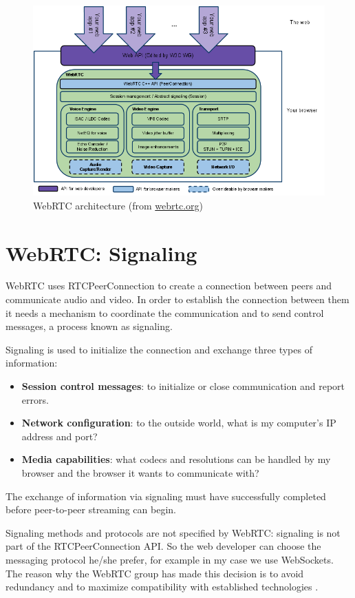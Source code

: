 \begin{figure}[ht]
  \centering
  \includegraphics[keepaspectratio=true, width=\textwidth]{images/webrtcArchitecture}\caption{WebRTC architecture (from \url{webrtc.org})}
  \label{fig:webrtcArchitecture}
\end{figure}

\section{WebRTC: Signaling}
\label{sec:webrtc_signaling}
WebRTC uses RTCPeerConnection to create a connection between peers and communicate audio and video. In order to establish the connection between them it needs a mechanism to coordinate the communication and to send control messages, a process known as signaling. 

Signaling is used to initialize the connection and exchange three types of information:
\begin{itemize}
	\item\textbf{Session control messages}: to initialize or close communication and report errors.
	\item\textbf{Network configuration}: to the outside world, what is my computer's IP address and port?
	\item\textbf{Media capabilities}: what codecs and resolutions can be handled by my browser and the browser it wants to communicate with?
\end{itemize}
The exchange of information via signaling must have successfully completed before peer-to-peer streaming can begin.

Signaling methods and protocols are not specified by WebRTC: signaling is not part of the RTCPeerConnection API. So the web developer can choose the messaging protocol he/she prefer, for example in my case we use WebSockets. The reason why the WebRTC group has made this decision is to avoid redundancy and to maximize compatibility with established technologies \cite{jsep}.

